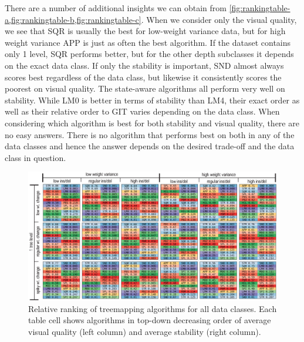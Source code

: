 There are a number of additional insights we can obtain from \cref{fig:rankingtable-a,fig:rankingtable-b,fig:rankingtable-c}. When we consider only the visual quality, we see that SQR is usually the best for low-weight variance data, but for high weight variance APP is just as often the best algorithm. If the dataset contains only 1 level, SQR performs better, but for the other depth subclasses it depends on the exact data class.
%
If only the stability is important, SND almost always scores best regardless of the data class, but likewise it consistently scores the poorest on visual quality. 
The state-aware algorithms all perform very well on stability. While LM0 is better in terms of stability than LM4, their exact order as well as their relative order to GIT varies depending on the data class.
%
When considering which algorithm is best for both stability and visual quality, there are no easy answers. There is no algorithm that performs best on both in any of the data classes and hence the answer depends on the desired trade-off and the data class in question.




\begin{figure}
\centering
\includegraphics[width=\linewidth]{figures/treemap-evaluation/table-a.png}
\caption{Relative ranking of treemapping algorithms for all data classes. Each table cell shows algorithms in top-down decreasing order of average visual quality (left column) and average stability (right column).}
\label{fig:rankingtable-a}
\end{figure}

